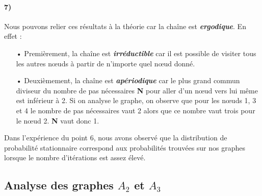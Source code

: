\documentclass[a4paper,titlepage]{report}
\begin{document}
\paragraph{7)} 
Nous pouvons relier ces résultats à la théorie car la chaîne est \textbf{\textit{ergodique}}. En effet : \\
\begin{itemize}
\item[•] Premièrement, la chaîne est \textbf{\textit{irréductible}} car il est possible de visiter tous les autres nœuds à partir de n'importe quel nœud donné.
\item[•] Deuxièmement, la chaîne est \textbf{\textit{apériodique}} car le plus grand commun diviseur du nombre de pas nécessaires \textbf{N} pour aller d'un nœud vers lui même est inférieur à 2. Si on analyse le graphe, on observe que pour les nœuds 1, 3 et 4 le nombre de pas nécessaires vaut 2 alors que ce nombre vaut trois pour le nœud 2. \textbf{N} vaut donc 1.\\
\end{itemize}

Dans l'expérience du point 6, nous avons observé que la distribution de probabilité stationnaire correspond aux probabilités trouvées sur nos graphes lorsque le nombre d'itérations est assez élevé.


\subsection*{Analyse des graphes $A_2$ et $A_3$}
\end{document}
